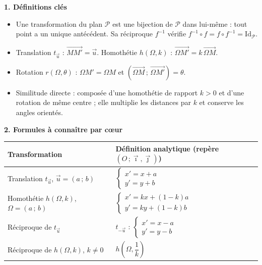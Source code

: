 \documentclass[11pt]{article}
\newcommand{\cle}[1]{{\popxbold\color{popdark}#1}}
\begin{document}
\begin{bilan}
\textbf{1. D\'efinitions cl\'es}
\begin{itemize}
  \item Une \cle{transformation} du plan $\mathcal{P}$ est une \cle{bijection} de $\mathcal{P}$ dans lui-m\^eme : tout point a un unique ant\'ec\'edent. Sa \cle{r\'eciproque} $f^{-1}$ v\'erifie $f^{-1}\circ f = f\circ f^{-1}=\mathrm{Id}_{\mathcal{P}}$.
  \item \cle{Translation} $t_{\vec{u}}$ : $\overrightarrow{MM'}=\vec{u}$. \cle{Homoth\'etie} $h(\Omega,k)$ : $\overrightarrow{\Omega M'}=k\,\overrightarrow{\Omega M}$.
  \item \cle{Rotation} $r(\Omega,\theta)$ : $\Omega M'=\Omega M$ et $(\overrightarrow{\Omega M}\,;\,\overrightarrow{\Omega M'})=\theta$.
  \item \cle{Similitude directe} : compos\'ee d'une homoth\'etie de rapport $k>0$ et d'une rotation de m\^eme centre ; elle multiplie les distances par $k$ et conserve les angles orient\'es.
\end{itemize}

\textbf{2. Formules \`a conna\^itre par c\oe ur}
\begin{center}
\begin{tabularx}{\linewidth}{|l|X|}
\hline
\rowcolor{popblueL} \textbf{Transformation} & \textbf{D\'efinition analytique (rep\`ere $(O\,;\vec{\imath},\vec{\jmath})$)} \\
\hline
Translation $t_{\vec{u}}$, $\vec{u}=(a\,;\,b)$ & $\begin{cases}x'=x+a\\ y'=y+b\end{cases}$ \\
\hline
Homoth\'etie $h(\Omega,k)$, $\Omega=(a\,;\,b)$ & $\begin{cases}x'=kx+(1-k)a\\ y'=ky+(1-k)b\end{cases}$ \\
\hline
R\'eciproque de $t_{\vec{u}}$ & $t_{-\vec{u}}$ : $\begin{cases}x'=x-a\\ y'=y-b\end{cases}$ \\
\hline
R\'eciproque de $h(\Omega,k)$, $k\neq 0$ & $h\!\left(\Omega,\dfrac{1}{k}\right)$ \\
\hline
\end{tabularx}
\end{center}


\end{bilan}
\end{document}
